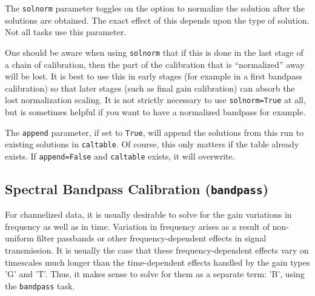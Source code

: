 The {\tt solnorm} parameter toggles on the option to normalize the
solution after the solutions are obtained.  The exact
effect of this depends upon the type of solution.  Not all tasks
use this parameter.  

One should be aware when using {\tt solnorm} that if this is done
in the last stage of a chain of calibration, then the part of 
the calibration that is ``normalized'' away will be lost.  It is
best to use this in early stages (for example in a first bandpass
calibration) so that later stages (such as final gain calibration)
can absorb the lost normalization scaling.  It is not strictly
necessary to use {\tt solnorm=True} at all, but is sometimes helpful
if you want to have a normalized bandpass for example.

The {\tt append} parameter, if set to {\tt True}, will append the
solutions from this run to existing solutions in {\tt caltable}.
Of course, this only matters if the table already exists.  If
{\tt append=False} and {\tt caltable} exists, it will overwrite.

\subsection{Spectral Bandpass Calibration ({\tt bandpass})}
\label{section:cal.solve.band}

For channelized data, it is usually desirable to solve for the gain
variations in frequency as well as in time.  Variation in frequency
arises as a result of non-uniform filter passbands or other frequency-dependent
effects in signal transmission.  It is usually the case that these
frequency-dependent effects vary on timescales much longer than the
time-dependent effects handled by the gain types 'G' and 'T'.  
Thus, it makes sense to solve for them as a separate term: 'B', using the
{\tt bandpass} task.

